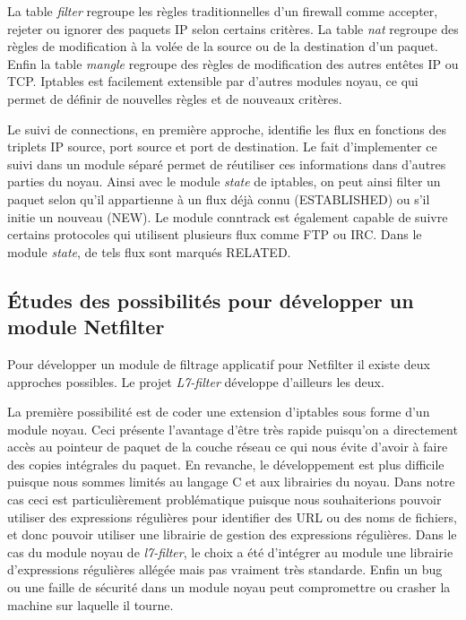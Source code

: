 La table \textit{filter} regroupe les règles traditionnelles d'un
firewall comme accepter, rejeter ou ignorer des paquets IP selon
certains critères. La table \textit{nat} regroupe des règles de
modification à la volée de la source ou de la destination d'un
paquet. Enfin la table \textit{mangle} regroupe des règles de
modification des autres entêtes IP ou TCP. Iptables est facilement
extensible par d'autres modules noyau, ce qui permet de définir de
nouvelles règles et de nouveaux critères.

Le suivi de connections, en première approche, identifie les flux en
fonctions des triplets IP source, port source et port de
destination. Le fait d'implementer ce suivi dans un module séparé
permet de réutiliser ces informations dans d'autres parties du
noyau. Ainsi avec le module \textit{state} de iptables, on peut ainsi
filter un paquet selon qu'il appartienne à un flux déjà connu
(ESTABLISHED) ou s'il initie un nouveau (NEW). Le module conntrack est
également capable de suivre certains protocoles qui utilisent
plusieurs flux comme FTP ou IRC. Dans le module \textit{state}, de
tels flux sont marqués RELATED.

\subsection{Études des possibilités pour développer un module Netfilter}


Pour développer un module de filtrage applicatif pour Netfilter il
existe deux approches possibles. Le projet \textit{L7-filter}
\cite{l7} développe d'ailleurs les deux.

La première possibilité est de coder une extension d'iptables sous
forme d'un module noyau. Ceci présente l'avantage d'être très rapide
puisqu'on a directement accès au pointeur de paquet de la couche
réseau ce qui nous évite d'avoir à faire des copies intégrales du
paquet. En revanche, le développement est plus difficile puisque nous
sommes limités au langage C et aux librairies du noyau. Dans notre cas
ceci est particulièrement problématique puisque nous souhaiterions
pouvoir utiliser des expressions régulières pour identifier des URL ou
des noms de fichiers, et donc pouvoir utiliser une librairie de
gestion des expressions régulières. Dans le cas du module noyau de
\textit{l7-filter}, le choix a été d'intégrer au module une librairie
d'expressions régulières allégée mais pas vraiment très
standarde. Enfin un bug ou une faille de sécurité dans un module noyau
peut compromettre ou crasher la machine sur laquelle il tourne.

